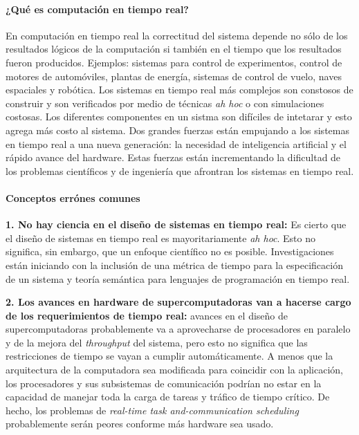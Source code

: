 \paragraph{\textnormal{\textbf{¿Qué es computación en tiempo real?}}} En computación en tiempo real la correctitud del sistema depende no sólo de los resultados lógicos de la computación si también en el tiempo que los resultados fueron producidos. Ejemplos: sistemas para control de experimentos, control de motores de automóviles, plantas de energía, sistemas de control de vuelo, naves espaciales y robótica. Los sistemas en tiempo real más complejos son constosos de construir y son verificados por medio de técnicas \emph{ah hoc} o con simulaciones costosas. Los diferentes componentes en un sistma son difíciles de intetarar y esto agrega más costo al sistema. Dos grandes fuerzas están empujando a los sistemas en tiempo real a una nueva generación: la necesidad de inteligencia artificial y el rápido avance del hardware. Estas fuerzas están incrementando la dificultad de los problemas científicos y de ingeniería que afrontran los sistemas en tiempo real.

\paragraph{\textnormal{\textbf{Conceptos errónes comunes}}} \textbf{1. No hay ciencia en el diseño de sistemas en tiempo real:} Es cierto que el diseño de sistemas en tiempo real es mayoritariamente \emph{ah hoc}. Esto no significa, sin embargo, que un enfoque científico no es posible. Investigaciones están iniciando con la inclusión de una métrica de tiempo para la especificación de un sistema y teoría semántica para lenguajes de programación en tiempo real. 

\textbf{2. Los avances en hardware de supercomputadoras van a hacerse cargo de los requerimientos de tiempo real:} avances en el diseño de supercomputadoras probablemente va a aprovecharse de procesadores en paralelo y de la mejora del \emph{throughput} del sistema, pero esto no significa que las restricciones de tiempo se vayan a cumplir automáticamente. A menos que la arquitectura de la computadora sea modificada para coincidir con la aplicación, los procesadores y sus subsistemas de comunicación podrían no estar en la capacidad de manejar toda la carga de tareas y tráfico de tiempo crítico. De hecho, los problemas de \emph{real-time task and-communication scheduling} probablemente serán peores conforme más hardware sea usado. 

